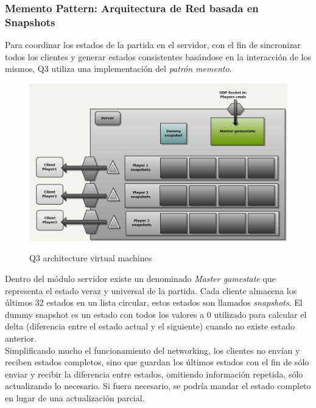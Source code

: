 \documentclass[a4paper,12pt]{report}
\begin{document}
    \subsubsection{Memento Pattern: Arquitectura de Red basada en Snapshots}
	Para coordinar los estados de la partida en el servidor, con el fin de sincronizar todos los clientes y generar estados consistentes basándose en la interacción de los mismos, Q3 utiliza una implementación del \textit{patrón memento}.\\
	
	\begin{center}
		\begin{figure}[h]
			\includegraphics[width=1\textwidth]{images/q3_network_arch}
			\label{fig:q3vm}
			\caption{Q3 architecture virtual machines}
		\end{figure}
	\end{center}

	Dentro del módulo servidor existe un denominado \textit{Master gamestate} que representa el estado veraz y universal de la partida. Cada cliente almacena los últimos 32 estados en un lista circular, estos estados son llamados \textit{snapshots}. El dummy snapshot es un estado con todos los valores a 0 utilizado para calcular el delta (diferencia entre el estado actual y el siguiente) cuando no existe estado anterior.\\
	
	Simplificando mucho el funcionamiento del networking, los clientes no envían y reciben estados completos, sino que guardan los últimos estados con el fin de sólo enviar y recibir la diferencia entre estados, omitiendo información repetida, sólo actualizando lo necesario. Si fuera necesario, se podría mandar el estado completo en lugar de una actualización parcial.\\
	
\end{document}
